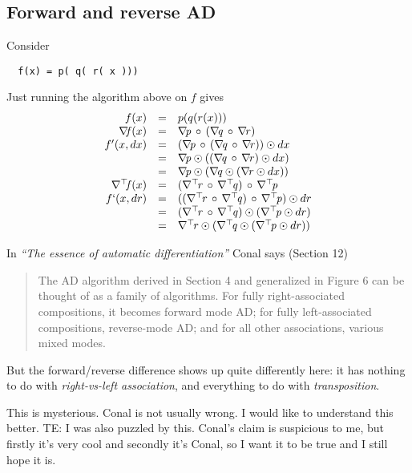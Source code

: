 \documentclass[sigplan,review]{acmart}
\newcommand{\gradf}[1]{\nabla\! \mathit{#1}}  %
\newcommand{\gradft}[1]{\nabla^{\top}\!\mathit{#1}}  %
\newcommand{\fwdDf}[1]{f'}  %
\newcommand{\revDf}[1]{f`}  %
\newcommand{\lmapply}{\odot}   %
\newcommand{\lmcomp}{\,\circ\,}   %
\newcommand{\tom}[1]{{\color{red}TE: #1}}
\begin{document}
\subsection{Forward and reverse AD}

Consider
\begin{lstlisting}
  f(x) = p( q( r( x )))
\end{lstlisting}
Just running the algorithm above on $f$ gives
$$
\begin{array}{rcl}
  f(x)  & = & p( q( r( x ))) \\
  \gradf{f}(x) & = & \gradf{p} \lmcomp (\gradf{q} \lmcomp \gradf{r}) \\
  \fwdDf{f}(x,dx) & = & (\gradf{p} \lmcomp (\gradf{q} \lmcomp \gradf{r})) \lmapply dx \\
  & = & \gradf{p} \lmapply ((\gradf{q} \lmcomp \gradf{r}) \lmapply dx) \\
  & = & \gradf{p} \lmapply (\gradf{q} \lmapply (\gradf{r} \lmapply dx)) \\
  \gradft{f}(x) & = & (\gradft{r} \lmcomp \gradft{q}) \lmcomp \gradft{p} \\
  \revDf{f}(x,dr) & = & ((\gradft{r} \lmcomp \gradft{q}) \lmcomp \gradft{p}) \lmapply dr \\
     & = & (\gradft{r} \lmcomp \gradft{q}) \lmapply (\gradft{p} \lmapply dr) \\
     & = & \gradft{r} \lmapply (\gradft{q} \lmapply (\gradft{p} \lmapply dr)) \\
\end{array}
$$

In \emph{``The essence of automatic differentiation''} Conal says (Section 12)
\begin{quote}
The AD algorithm derived in Section 4 and generalized in Figure 6 can be thought of as a family
of algorithms. For fully right-associated compositions, it becomes forward mode AD; for fully
left-associated compositions, reverse-mode AD; and for all other associations, various mixed modes.
\end{quote}
But the forward/reverse difference shows up quite differently here: it has nothing to do
with \emph{right-vs-left association}, and everything to do with \emph{transposition}.

This is mysterious.  Conal is not usually wrong.  I would like to
understand this better.
\tom{I was also puzzled by this.  Conal's claim is suspicious to me,
  but firstly it's very cool and secondly it's Conal, so I want it to
  be true and I still hope it is.}
\end{document}
